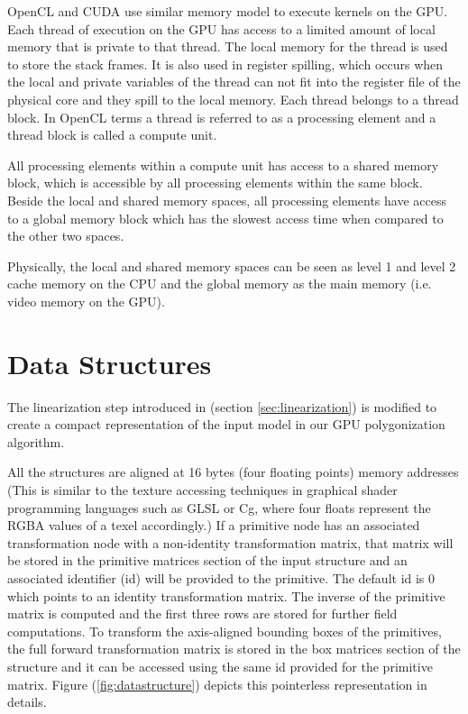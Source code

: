 OpenCL and CUDA use similar memory model to execute kernels on the GPU. Each thread of 
execution on the GPU has access to a limited amount of local memory that is private to that thread. 
The local memory for the thread is used to store the stack frames. It is also used in register spilling, 
which occurs when the local and private variables of the thread can not fit into the register file of the
physical core and they spill to the local memory. Each thread belongs to a thread block. In OpenCL terms 
a thread is referred to as a processing element and a thread block is called a compute unit. 

All processing elements within a compute unit has access to a shared memory block, which is 
accessible by all processing elements within the same block. Beside the local and shared memory
spaces, all processing elements have access to a global memory block which has the slowest access 
time when compared to the other two spaces. 

Physically, the local and shared memory spaces can be seen as level 1 and level 2 cache memory on the CPU and
the global memory as the main memory (i.e. video memory on the GPU).



\section{Data Structures}
\label{sec:datastructure}
The \blob linearization step introduced in (section \ref{sec:linearization}) is modified to create a compact representation of the input model in our 
GPU polygonization algorithm. 

All the structures are aligned at 16 bytes (four floating points) memory addresses (This is similar to the texture 
accessing techniques in graphical shader programming languages such as GLSL or Cg, where four floats represent the 
RGBA values of a texel accordingly.) If a primitive node has an associated transformation node with a non-identity 
transformation matrix, that matrix will be stored in the primitive matrices section of the input structure and an 
associated identifier (id) will be provided to the primitive. The default id is 0 which points to an identity transformation 
matrix. The inverse of the primitive matrix is computed and the first three rows are stored for further field 
computations. To transform the axis-aligned bounding boxes of the primitives, the full forward transformation matrix is 
stored in the box matrices section of the structure and it can be accessed using the same id provided for the primitive matrix.
Figure (\ref{fig:datastructure}) depicts this pointerless representation in details.

